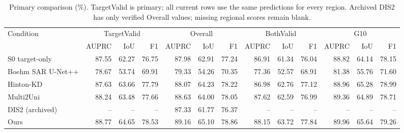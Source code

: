 \begin{table}[!t]
\caption{Primary comparison (\%). TargetValid is primary; all current rows use the same predictions for every region. Archived DIS2 has only verified Overall values; missing regional scores remain blank.}
\label{tab:primary}
\centering\scriptsize
\setlength{\tabcolsep}{3pt}
\begin{tabular}{lrrrrrrrrrrrr}
\toprule
Condition & \multicolumn{3}{c}{TargetValid} & \multicolumn{3}{c}{Overall} & \multicolumn{3}{c}{BothValid} & \multicolumn{3}{c}{G10}\\
 & AUPRC & IoU & F1 & AUPRC & IoU & F1 & AUPRC & IoU & F1 & AUPRC & IoU & F1\\
\midrule
S0 target-only & 87.55 & 62.27 & 76.75 & 87.98 & 62.91 & 77.24 & 86.91 & 61.34 & 76.04 & 88.82 & 64.14 & 78.15\\
Boehm SAR U-Net++ \cite{Boehm2022} & 78.67 & 53.74 & 69.91 & 79.33 & 54.26 & 70.35 & 77.36 & 52.57 & 68.91 & 81.38 & 55.76 & 71.60\\
Hinton-KD \cite{Hinton2015} & 87.63 & 63.66 & 77.79 & 88.07 & 64.23 & 78.22 & 86.98 & 62.76 & 77.12 & 88.96 & 65.28 & 78.99\\
Multi2Uni & 88.24 & 63.48 & 77.66 & 88.63 & 64.00 & 78.05 & 87.62 & 62.59 & 76.99 & 89.36 & 64.89 & 78.71\\
DIS2 (archived) \cite{Kieu2026DIS2} & -- & -- & -- & 87.33 & 61.77 & 76.37 & -- & -- & -- & -- & -- & --\\
Ours & 88.77 & 64.65 & 78.53 & 89.16 & 65.10 & 78.86 & 88.15 & 63.72 & 77.84 & 89.96 & 65.64 & 79.26\\
\bottomrule
\end{tabular}
\end{table}
